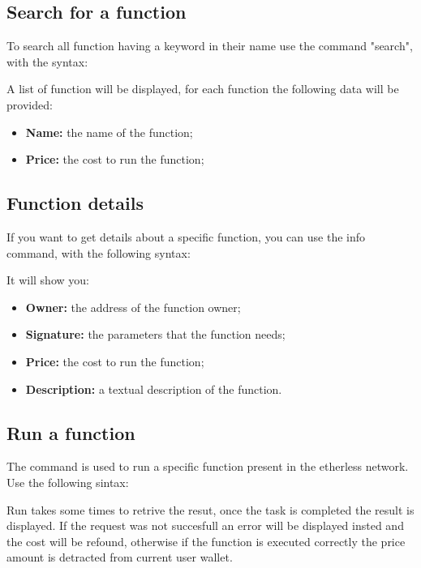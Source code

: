 \subsection{Search for a function}
To search all function having a keyword in their name use the command "search", with the syntax:
\begin{center}
\end{center}

A list of function will be displayed, for each function the following data will be provided:
\begin{itemize}
	\item \textbf{Name: } the name of the function;
	\item \textbf{Price: } the cost to run the function;
\end{itemize}

\subsection{Function details}
If you want to get details about a specific function, you can use the info command, with the following syntax: \\
\begin{center}
\end{center}
It will show you:
\begin{itemize}
	\item \textbf{Owner: } the address of the function owner;
	\item \textbf{Signature: } the parameters that the function needs;
	\item \textbf{Price: } the cost to run the function;
	\item \textbf{Description: } a textual description of the function.
\end{itemize}

\subsection{Run a function}
The command is used to run a specific function present in the etherless network. Use the following sintax: \\
\begin{center}
\end{center}
Run takes some times to retrive the resut, once the task is completed the result is displayed. If the request was not succesfull an error will be displayed insted and the cost will be refound, otherwise if the function is executed correctly the price amount is detracted from current user wallet.


